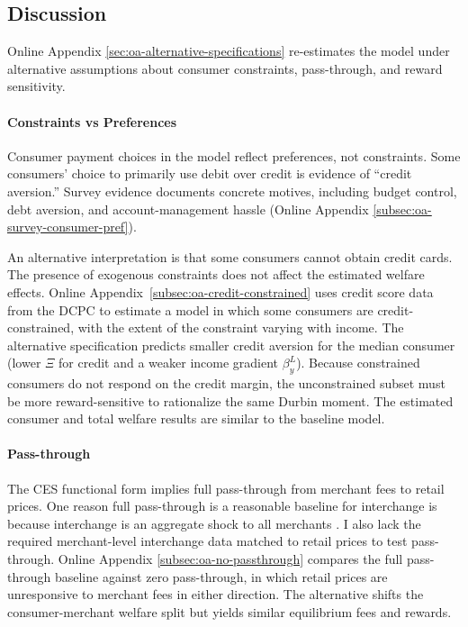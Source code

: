 \documentclass[main.tex]{subfiles}
\begin{document}
\subsection{Discussion}
\label{subsec:cf-discussion}

Online Appendix \ref{sec:oa-alternative-specifications} re-estimates the model under alternative assumptions about consumer constraints, pass-through, and reward sensitivity.

\paragraph{Constraints vs Preferences}
\label{subsec:revealed-pref-approx}
Consumer payment choices in the model reflect preferences, not constraints.
Some consumers' choice to primarily use debit over credit is evidence of ``credit aversion.''
Survey evidence documents concrete motives, including budget control, debt aversion, and account-management hassle (Online Appendix \ref{subsec:oa-survey-consumer-pref}).

An alternative interpretation is that some consumers cannot obtain credit cards.
The presence of exogenous constraints does not affect the estimated welfare effects.
Online Appendix~\ref{subsec:oa-credit-constrained} uses credit score data from the DCPC to estimate a model in which some consumers are credit-constrained, with the extent of the constraint varying with income.
The alternative specification predicts smaller credit aversion for the median consumer (lower $\Xi$ for credit and a weaker income gradient $\beta_y^L$).
Because constrained consumers do not respond on the credit margin, the unconstrained subset must be more reward-sensitive to rationalize the same Durbin moment.
The estimated consumer and total welfare results are similar to the baseline model.


\paragraph{Pass-through}
\label{subsubsec:passthrough-theory}
The CES functional form implies full pass-through from merchant fees to retail prices.
One reason full pass-through is a reasonable baseline for interchange is because interchange is an aggregate shock to all merchants \parencite{Amiti.etal2019}.
I also lack the required merchant-level interchange data matched to retail prices to test pass-through.
Online Appendix \ref{subsec:oa-no-passthrough} compares the full pass-through baseline against zero pass-through, in which retail prices are unresponsive to merchant fees in either direction.
The alternative shifts the consumer-merchant welfare split but yields similar equilibrium fees and rewards.
\end{document}
